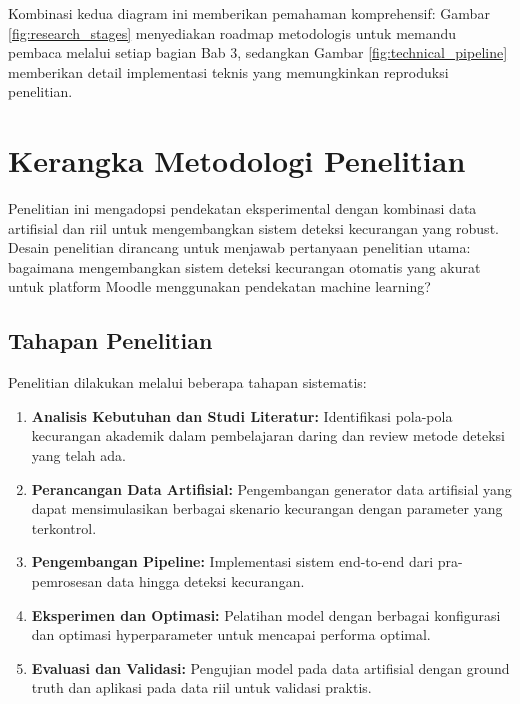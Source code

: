 Kombinasi kedua diagram ini memberikan pemahaman komprehensif: Gambar \ref{fig:research_stages} menyediakan roadmap metodologis untuk memandu pembaca melalui setiap bagian Bab 3, sedangkan Gambar \ref{fig:technical_pipeline} memberikan detail implementasi teknis yang memungkinkan reproduksi penelitian.

\section{Kerangka Metodologi Penelitian}
\label{sec:desainPenelitian}
Penelitian ini mengadopsi pendekatan eksperimental dengan kombinasi data artifisial dan riil untuk mengembangkan sistem deteksi kecurangan yang robust. Desain penelitian dirancang untuk menjawab pertanyaan penelitian utama: bagaimana mengembangkan sistem deteksi kecurangan otomatis yang akurat untuk platform Moodle menggunakan pendekatan machine learning?

\subsection{Tahapan Penelitian}
Penelitian dilakukan melalui beberapa tahapan sistematis:

\begin{enumerate}
    \item \textbf{Analisis Kebutuhan dan Studi Literatur:} Identifikasi pola-pola kecurangan akademik dalam pembelajaran daring dan review metode deteksi yang telah ada.
    
    \item \textbf{Perancangan Data Artifisial:} Pengembangan generator data artifisial yang dapat mensimulasikan berbagai skenario kecurangan dengan parameter yang terkontrol.
    
    \item \textbf{Pengembangan Pipeline:} Implementasi sistem end-to-end dari pra-pemrosesan data hingga deteksi kecurangan.
    
    \item \textbf{Eksperimen dan Optimasi:} Pelatihan model dengan berbagai konfigurasi dan optimasi hyperparameter untuk mencapai performa optimal.
    
    \item \textbf{Evaluasi dan Validasi:} Pengujian model pada data artifisial dengan ground truth dan aplikasi pada data riil untuk validasi praktis.
\end{enumerate}

